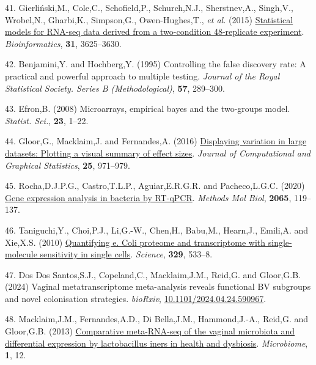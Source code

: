 \documentclass[
]{article}
\newlength{\cslhangindent}
\newenvironment{CSLReferences}[2] %
 {\begin{list}{}{%
  \setlength{\itemindent}{0pt}
  \setlength{\leftmargin}{0pt}
  \setlength{\parsep}{0pt}
  \ifodd #1
   \setlength{\leftmargin}{\cslhangindent}
   \setlength{\itemindent}{-1\cslhangindent}
  \fi
  \setlength{\itemsep}{#2\baselineskip}}}
 {\end{list}}
\begin{document}
\begin{CSLReferences}{1}{1}
41. Gierliński,M., Cole,C., Schofield,P., Schurch,N.J., Sherstnev,A.,
Singh,V., Wrobel,N., Gharbi,K., Simpson,G., Owen-Hughes,T., \emph{et
al.} (2015)
\href{https://doi.org/10.1093/bioinformatics/btv425}{Statistical models
for RNA-seq data derived from a two-condition 48-replicate experiment}.
\emph{Bioinformatics}, \textbf{31}, 3625--3630.

42. Benjamini,Y. and Hochberg,Y. (1995) Controlling the false discovery
rate: A practical and powerful approach to multiple testing.
\emph{Journal of the Royal Statistical Society. Series B
(Methodological)}, \textbf{57}, 289--300.

43. Efron,B. (2008) Microarrays, empirical bayes and the two-groups
model. \emph{Statist. Sci.}, \textbf{23}, 1--22.

44. Gloor,G., Macklaim,J. and Fernandes,A. (2016)
\href{https://doi.org/10.1080/10618600.2015.1131161}{Displaying
variation in large datasets: Plotting a visual summary of effect sizes}.
\emph{Journal of Computational and Graphical Statistics}, \textbf{25},
971--979.

45. Rocha,D.J.P.G., Castro,T.L.P., Aguiar,E.R.G.R. and Pacheco,L.G.C.
(2020) \href{https://doi.org/10.1007/978-1-4939-9833-3_10}{Gene
expression analysis in bacteria by RT-qPCR}. \emph{Methods Mol Biol},
\textbf{2065}, 119--137.

46. Taniguchi,Y., Choi,P.J., Li,G.-W., Chen,H., Babu,M., Hearn,J.,
Emili,A. and Xie,X.S. (2010)
\href{https://doi.org/10.1126/science.1188308}{Quantifying e. Coli
proteome and transcriptome with single-molecule sensitivity in single
cells}. \emph{Science}, \textbf{329}, 533--8.

47. Dos Dos Santos,S.J., Copeland,C., Macklaim,J.M., Reid,G. and
Gloor,G.B. (2024) Vaginal metatranscriptome meta-analysis reveals
functional BV subgroups and novel colonisation strategies.
\emph{bioRxiv},
\href{https://doi.org/10.1101/2024.04.24.590967}{10.1101/2024.04.24.590967}.

48. Macklaim,J.M., Fernandes,A.D., Di Bella,J.M., Hammond,J.-A., Reid,G.
and Gloor,G.B. (2013)
\href{https://doi.org/10.1186/2049-2618-1-12}{Comparative meta-{RNA}-seq
of the vaginal microbiota and differential expression by lactobacillus
iners in health and dysbiosis}. \emph{Microbiome}, \textbf{1}, 12.


\end{CSLReferences}
\end{document}
